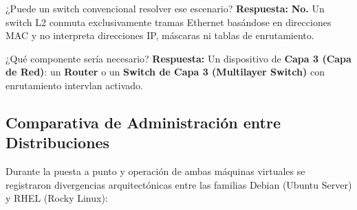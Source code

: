 \documentclass[11pt,a4paper]{article}
\begin{document}
\begin{pregunta}{¿Puede un switch convencional resolver ese escenario?}
    \textbf{Respuesta:} \textbf{No.} Un switch L2 conmuta exclusivamente tramas Ethernet basándose en direcciones MAC y no interpreta direcciones IP, máscaras ni tablas de enrutamiento.
\end{pregunta}

\begin{pregunta}{¿Qué componente sería necesario?}
    \textbf{Respuesta:} Un dispositivo de \textbf{Capa 3 (Capa de Red)}: un \textbf{Router} o un \textbf{Switch de Capa 3 (Multilayer Switch)} con enrutamiento intervlan activado.
\end{pregunta}

\subsection{Comparativa de Administración entre Distribuciones}

Durante la puesta a punto y operación de ambas máquinas virtuales se registraron divergencias arquitectónicas entre las familias Debian (Ubuntu Server) y RHEL (Rocky Linux):
\end{document}
